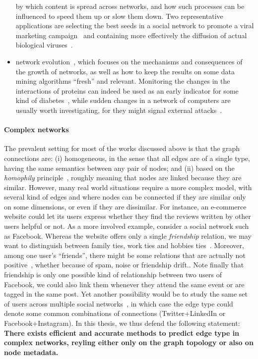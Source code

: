 \begin{itemize}[nosep,leftmargin=*]
    by which content is spread across networks, and how such processes can be influenced to speed
    them up or slow them down. Two representative applications are selecting the best seeds in a social
    network to promote a viral marketing campaign~\autocite{infmaxKempe15} and containing more effectively the
    diffusion of actual biological viruses~\autocite{influenceBio13}.
  \item network evolution~\autocite{networkEvolution14}, which focuses on the mechanisms and
    consequences of the growth of networks, as well as how to keep the results on some data
    mining algorithms \enquote{fresh} and relevant. Monitoring the changes in the interactions of
    proteins can indeed be used as an early indicator for some kind of
    diabetes~\autocite{evolBio10}, while sudden changes in a network of computers are usually worth
    investigating, for they might signal external attacks~\autocite{evolSecurity04}.
\end{itemize}

\vspace{-\baselineskip}
\paragraph{Complex networks}

The prevalent setting for most of the works discussed above is that the graph connections are: (i)
homogeneous, in the sense that all edges are of a single type, having the same semantics  between
any pair of nodes; and (ii) based on the \emph{homophily} principle~\autocite{Homophily01}, roughly
meaning that nodes are linked because they are similar. However, many real world situations require
a more complex model, with several kind of edges and where nodes can be connected if they are
similar only on some dimensions, or even if they are dissimilar. For instance, an e-commerce website
could let its users express whether they find the reviews written by other users helpful or not. As a
more involved example, consider a social network such as Facebook. Whereas the website offers only a
single \emph{friendship} relation, we may want to distinguish between family ties, work ties and
hobbies ties~\autocite{egoNips12}. Moreover, among one user's \enquote{friends}, there might be some
relations that are actually not positive~\autocite{Yang2012}, whether because of spam, noise or
friendship drift.. Note finally that friendship is only one possible kind of relationship between two
users of Facebook, we could also link them whenever they attend the same event or are tagged in the
same post. Yet another possibility would be to study the same set of users across multiple social
networks~\autocite{mergingNetworks16}, in which case the edge type could denote some common
combinations of connections (\eg Twitter+LinkedIn or Facebook+Instagram). In this thesis, we thus
defend the following statement: \textbf{There exists efficient and accurate methods to predict edge
type in complex networks, reyling either only on the graph topology or also on node metadata.}

